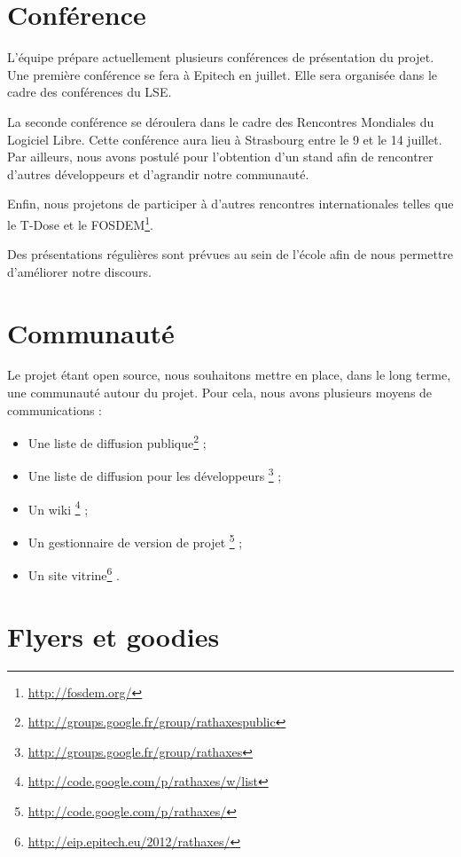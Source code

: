 \documentclass[francais]{rtxreport}
\begin{document}

\section{Conférence}
L'équipe prépare actuellement plusieurs conférences de présentation du projet.
Une première conférence se fera à Epitech en juillet. Elle sera organisée dans
le cadre des conférences du LSE.

La seconde conférence se déroulera dans le cadre des Rencontres Mondiales du
Logiciel Libre. Cette conférence aura lieu à Strasbourg entre le 9 et le 14
juillet. Par ailleurs, nous avons postulé pour l'obtention d'un stand afin de
rencontrer d'autres développeurs et d'agrandir notre communauté.

Enfin, nous projetons de participer à d'autres rencontres internationales telles
que le T-Dose et le FOSDEM\footnote{\url{http://fosdem.org/}}.

Des présentations régulières sont prévues au sein de l'école afin de nous
permettre d'améliorer notre discours.

\section{Communauté}
Le projet étant open source, nous souhaitons mettre en place, dans le long
terme, une communauté autour du projet. Pour cela, nous avons plusieurs moyens
de communications :

\begin{itemize}
\item Une liste de diffusion publique\footnote{\url{http://groups.google.fr/group/rathaxespublic}} ; 
\item Une liste de diffusion pour les développeurs \footnote{\url{http://groups.google.fr/group/rathaxes}} ; 
\item Un wiki \footnote{\url{http://code.google.com/p/rathaxes/w/list}} ;
\item Un gestionnaire de version de projet \footnote{\url{http://code.google.com/p/rathaxes/}} ;
\item Un site vitrine\footnote{\url{http://eip.epitech.eu/2012/rathaxes/}} . 
\end{itemize}


\section{Flyers et goodies}
\end{document}
